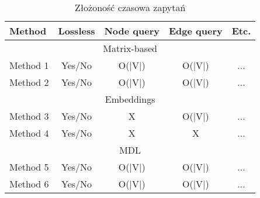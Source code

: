     \begin{table}[htbp]
        \centering
        \caption{Złożoność czasowa zapytań}
        \begin{tabular}{l | c | c | c | c}
        \toprule
        \textbf{Method} & \textbf{Lossless} & \textbf{Node query} & \textbf{Edge query} & \textbf{Etc.} \\
        \midrule
        \multicolumn{5}{c}{Matrix-based} \\
        \midrule
        Method 1 & Yes/No & O(|V|) & O(|V|) & ... \\
        Method 2 & Yes/No & O(|V|) & O(|V|) & ... \\
        \midrule
        \multicolumn{5}{c}{Embeddings} \\
        \midrule
        Method 3 & Yes/No & X & O(|V|) & ... \\
        Method 4 & Yes/No & X & X & ... \\
        \midrule
        \multicolumn{5}{c}{MDL} \\
        \midrule
        Method 5 & Yes/No & O(|V|) & O(|V|) & ... \\
        Method 6 & Yes/No & O(|V|) & O(|V|) & ... \\
        \bottomrule
        \end{tabular}
    \end{table}